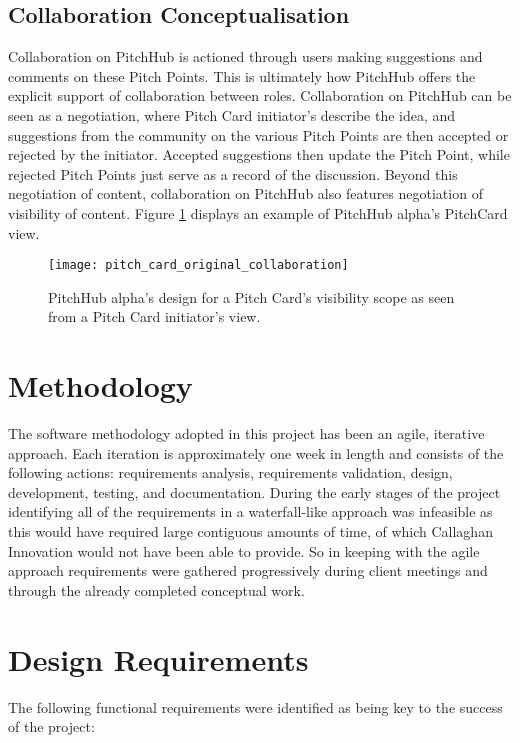 \subsection{Collaboration Conceptualisation}
Collaboration on PitchHub is actioned through users making suggestions and comments on these Pitch Points. This is ultimately how PitchHub offers the explicit support of collaboration between roles. Collaboration on PitchHub can be seen as a negotiation, where Pitch Card initiator's describe the idea, and suggestions from the community on the various Pitch Points are then accepted or rejected by the initiator. Accepted suggestions then update the Pitch Point, while rejected Pitch Points just serve as a record of the discussion. Beyond this negotiation of content, collaboration on PitchHub also features negotiation of visibility of content. Figure \ref{fig:pitch_card_original_collaboration} displays an example of PitchHub alpha's PitchCard view.
\begin{figure}[ht]
    \centering
    \texttt{[image: pitch\_card\_original\_collaboration]}
    \caption{PitchHub alpha's design for a Pitch Card's visibility scope as seen from a Pitch Card initiator's view.}
    \label{fig:pitch_card_original_collaboration}
\end{figure}

\section{Methodology}
The software methodology adopted in this project has been an agile, iterative approach. Each iteration is approximately one week in length and consists of the following actions: requirements analysis, requirements validation, design, development, testing, and documentation. During the early stages of the project identifying all of the requirements in a waterfall-like approach was infeasible as this would have required large contiguous amounts of time, of which Callaghan Innovation would not have been able to provide. So in keeping with the agile approach requirements were gathered progressively during client meetings and through the already completed conceptual work. 

\section{Design Requirements}\label{S:designRequirements}
The following functional requirements were identified as being key to the success of the project:

